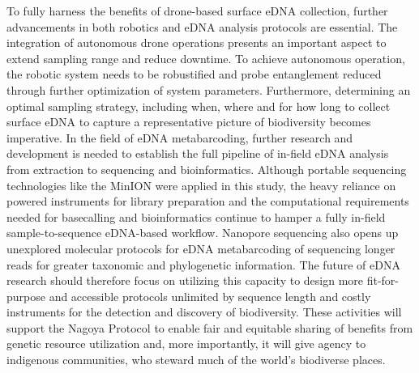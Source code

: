 
To fully harness the benefits of drone-based surface \gls{eDNA} collection, further advancements in both robotics and \gls{eDNA} analysis protocols are essential. The integration of autonomous drone operations presents an important aspect to extend sampling range and reduce downtime. To achieve autonomous operation, the robotic system needs to be robustified and probe entanglement reduced through further optimization of system parameters. Furthermore, determining  an optimal sampling strategy, including when, where and for how long to collect surface \gls{eDNA} to capture a representative picture of biodiversity becomes imperative.
In the field of \gls{eDNA} metabarcoding, further research and development is needed to establish the full pipeline of in-field \gls{eDNA} analysis from extraction to sequencing and bioinformatics. Although portable sequencing technologies like the MinION were applied in this study, the heavy reliance on powered instruments for library preparation and the computational requirements needed for basecalling and bioinformatics continue to hamper a fully in-field sample-to-sequence eDNA-based workflow. Nanopore sequencing also opens up unexplored molecular protocols for \gls{eDNA} metabarcoding of sequencing longer reads for greater taxonomic and phylogenetic information. The future of \gls{eDNA} research should therefore focus on utilizing this capacity to design more fit-for-purpose and accessible protocols unlimited by sequence length and costly instruments for the detection and discovery of biodiversity. These activities will support the Nagoya Protocol \cite{nagoya} to enable fair and equitable sharing of benefits from genetic resource utilization and, more importantly, it will give agency to indigenous communities, who steward much of the world's biodiverse places. 

